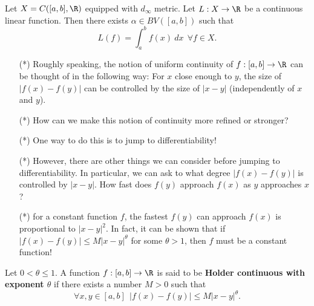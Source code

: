 \begin{theorem}
    Let \( X = C([a,b], \R ) \) equipped with \( {d}_{\infty } \) metric. Let \( L : X \to \R  \) be a continuous linear function. Then there exists \( \alpha \in BV ([a,b]) \) such that 
    \[  L(f) = \int_{ a }^{ b } f(x) \ dx \ \ \forall f \in X. \]
\end{theorem}

\begin{remark}
    \begin{enumerate}
        \item[(*)] Roughly speaking, the notion of uniform continuity of \( f:[a,b] \to \R  \) can be thought of in the following way: For \( x  \) close enough to \( y \), the size of \( | f(x) - f(y) |  \) can be controlled by the size of \( | x - y  |  \) (independently of \( x  \) and \( y \)).
        \item[(*)] How can we make this notion of continuity more refined or stronger?
        \item[(*)] One way to do this is to jump to differentiability!
    \end{enumerate}
\end{remark}

\begin{remark}
   \begin{enumerate}
       \item[(*)] However, there are other things we can consider before jumping to differentiability. In particular, we can ask to what degree \( | f(x) - f(y) |  \) is controlled by \( | x - y  | \). How fast does \( f(y) \) approach \( f(x) \) as \( y  \) approaches \( x  \)?
        \item[(*)] for a constant function \( f  \), the fastest \( f(y) \) can approach \( f(x) \) is proportional to \( | x - y  |^{2} \). In fact, it can be shown that if \( | f(x) - f(y) |  \leq M |  x - y  |^{\theta} \) for some \( \theta > 1  \), then \( f  \) must be a constant function!
   \end{enumerate} 
\end{remark}

\begin{definition}
    Let \( 0 < \theta \leq 1  \). A function \( f: [a,b] \to \R  \) is said to be \textbf{Holder continuous with exponent \( \theta \)} if there exists a number \( M > 0  \) such that 
    \[  \forall x ,y \in [a,b] \ \ | f(x) - f(y) |  \leq M |  x-  y  |^{\theta}. \]
\end{definition}

